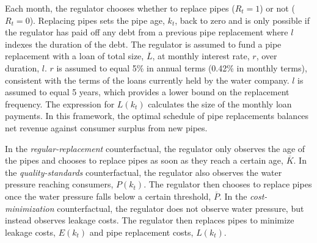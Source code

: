 \documentclass[12pt,table]{article}
\begin{document}
Each month, the regulator chooses whether to replace pipes ($R_t = 1$) or not ($R_t = 0$).  Replacing pipes sets the pipe age, $k_t$, back to zero and is only possible if the regulator has paid off any debt from a previous pipe replacement where $l$ indexes the duration of the debt.  The regulator is assumed to fund a pipe replacement with a loan of total size, $\overline{L}$, at monthly interest rate, $r$, over duration, $l$. $r$ is assumed to equal  5\% in annual terms (0.42\% in monthly terms), consistent with the terms of the loans currently held by the water company.  $l$ is assumed to equal 5 years, which provides a lower bound on the replacement frequency.  The expression for $L(k_t)$ calculates the size of the monthly loan payments.  In this framework, the optimal schedule of pipe replacements balances net revenue against consumer surplus from new pipes.




In the \textit{regular-replacement} counterfactual, the regulator only observes the age of the pipes and chooses to replace pipes as soon as they reach a certain age, $\overline{K}$.  In the \textit{quality-standards} counterfactual, the regulator also observes the water pressure reaching consumers, $P(k_t)$.  The regulator then chooses to replace pipes once the water pressure falls below a certain threshold, $\overline{P}$.  In the \textit{cost-minimization} counterfactual, the regulator does not observe water pressure, but instead observes leakage costs.  The regulator then replaces pipes to minimize leakage costs, $E(k_{t})$ and pipe replacement costs, $L(k_{t})$.  

\end{document}
